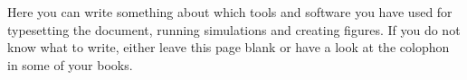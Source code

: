 \thispagestyle{empty}
{\small
\strut\vfill %
\vspace{0.2cm}
\noindent Here you can write something about which tools and software you have used for typesetting the document, running simulations and creating figures. If you do not know what to write, either leave this page blank or have a look at the colophon in some of your books.
}
\clearpage

